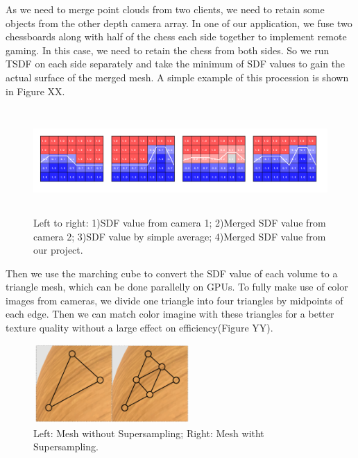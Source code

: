 As we need to merge point clouds from two clients, we need to retain some objects from the other depth camera array. In one of our application, we fuse two chessboards along with half of the chess each side together to implement remote gaming. In this case, we need to retain the chess from both sides. So we run TSDF on each side separately and take the minimum of SDF values to gain the actual surface of the merged mesh. A simple example of this procession is shown in Figure XX.

\begin{figure}[!htbp]
\centering
\includegraphics[width=14cm,height=4cm]{figures/figure_tsdf.png}
\setlength{\abovecaptionskip}{-0.5cm}
\caption{Left to right: 1)SDF value from camera 1; 2)Merged SDF value from camera 2; 3)SDF value by simple average; 4)Merged SDF value from our project.}
\label{3}
\end{figure}
    
Then we use the marching cube to convert the SDF value of each volume to a triangle mesh, which can be done parallelly on GPUs. To fully make use of color images from cameras, we divide one triangle into four triangles by midpoints of each edge. Then we can match color imagine with these triangles for a better texture quality without a large effect on efficiency(Figure YY).

\begin{figure}[H]
\centering
\includegraphics[width=6cm,height=3cm]{figures/figure_mc.png}
\setlength{\abovecaptionskip}{0.5cm}
\caption{Left: Mesh without Supersampling; Right: Mesh witht Supersampling.}
\label{4}
\end{figure}


